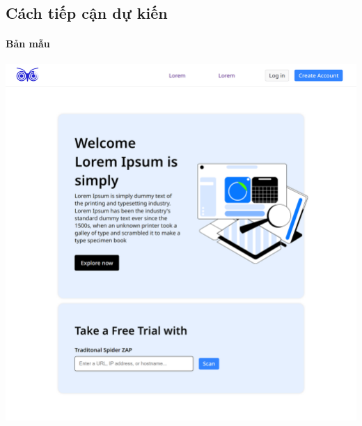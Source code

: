 \subsection{Cách tiếp cận dự kiến}
\paragraph{Bản mẫu}
\vspace{1cm}

\includegraphics[width=\textwidth]{images/prototype/prototype_22112022/home.png}

